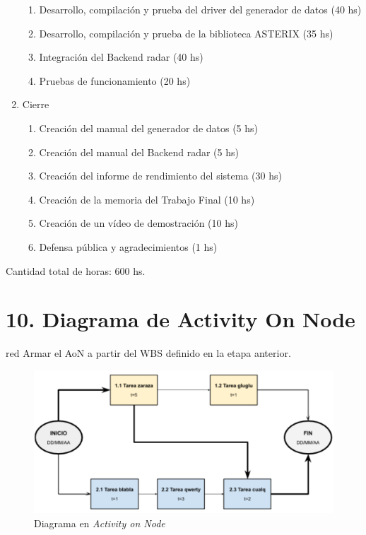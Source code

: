 \documentclass[
11pt, %
]{charter}
\begin{document}
\begin{enumerate}
\begin{enumerate}
	\item Desarrollo, compilación y prueba del driver del generador de datos (40 hs)
	\item Desarrollo, compilación y prueba de la biblioteca ASTERIX (35 hs)
	\item Integración del Backend radar (40 hs)
	\item Pruebas de funcionamiento (20 hs)
	\end{enumerate}
\item Cierre
	\begin{enumerate}
	\item Creación del manual del generador de datos (5 hs)
	\item Creación del manual del Backend radar (5 hs)
	\item Creación del informe de rendimiento del sistema (30 hs)
	\item Creación de la memoria del Trabajo Final (10 hs)
	\item Creación de un vídeo de demostración (10 hs)
	\item Defensa pública y agradecimientos (1 hs)
	\end{enumerate}
\end{enumerate}

Cantidad total de horas: 600 hs.


\section{10. Diagrama de Activity On Node}
\label{sec:AoN}

\begin{consigna}{red}
Armar el AoN a partir del WBS definido en la etapa anterior. 



\end{consigna}

\begin{figure}[htpb]
\centering 
\includegraphics[width=.8\textwidth]{./Figuras/AoN.png}
\caption{Diagrama en \textit{Activity on Node}}
\label{fig:AoN}
\end{figure}
\end{document}
